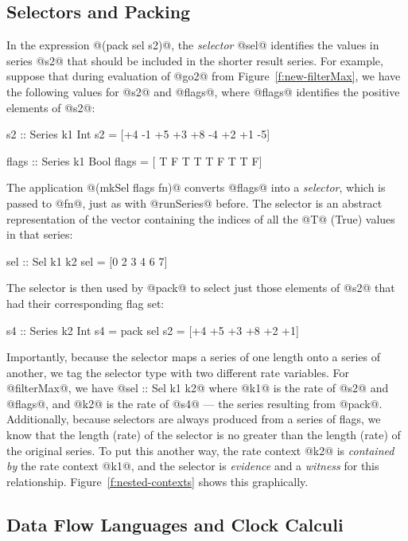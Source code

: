 \subsection{Selectors and Packing}
\label{s:SelectorsAndPacking}

In the expression @(pack sel s2)@, the \emph{selector} @sel@ identifies the values in series @s2@ that should be included in the shorter result series. For example, suppose that during evaluation of @go2@ from Figure~\ref{f:new-filterMax}, we have the following values for @s2@ and @flags@, where @flags@ identifies the positive elements of @s2@:
%
\begin{code}
  s2    :: Series k1 Int
  s2    = [+4 -1 +5 +3 +8 -4 +2 +1 -5]

  flags :: Series k1 Bool
  flags = [ T  F  T  T  T  F  T  T  F]
\end{code}
%
The application @(mkSel flags fn)@ converts @flags@ into a \emph{selector}, which is passed to @fn@, just as with @runSeries@ before. The selector is an abstract representation of the vector containing the indices of all the @T@ (True) values in that series: 
%
\begin{code}
  sel :: Sel k1 k2
  sel = [0 2 3 4 6 7]
\end{code}
%
The selector is then used by @pack@ to select just those elements of @s2@ that had their corresponding flag set: 
%
\begin{code}
  s4  :: Series k2 Int
  s4  = pack sel s2  =  [+4 +5 +3 +8 +2 +1]
\end{code}

Importantly, because the selector maps a series of one length onto a series of another, we tag the selector type with two different rate variables. For @filterMax@, we have @sel :: Sel k1 k2@ where @k1@ is the rate of @s2@ and @flags@, and @k2@ is the rate of @s4@ --- the series resulting from @pack@. Additionally, because selectors are always produced from a series of flags, we know that the length (rate) of the selector is no greater than the length (rate) of the original series. To put this another way, the rate context @k2@ is \emph{contained by} the rate context @k1@, and the selector is \emph{evidence} and a \emph{witness} for this relationship. Figure~\ref{f:nested-contexts} shows this graphically.


\subsection{Data Flow Languages and Clock Calculi}
\label{s:DataFlowLanguages}


